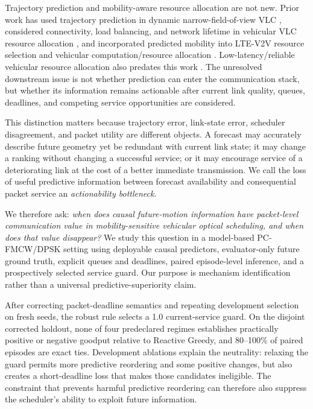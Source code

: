 \documentclass[conference]{IEEEtran}
\begin{document}
Trajectory prediction and mobility-aware resource allocation are not new. Prior work has used trajectory prediction in dynamic narrow-field-of-view VLC \cite{jiang2020trajectory}, considered connectivity, load balancing, and network lifetime in vehicular VLC resource allocation \cite{msongaleli2020resource}, and incorporated predicted mobility into LTE-V2V resource selection and vehicular computation/resource allocation \cite{hajrasouliha2021trajectory,guo2022trajectoryoffload,lu2024predictive}. Low-latency/reliable vehicular resource allocation also predates this work \cite{guo2019latency}. The unresolved downstream issue is not whether prediction can enter the communication stack, but whether its information remains actionable after current link quality, queues, deadlines, and competing service opportunities are considered.

This distinction matters because trajectory error, link-state error, scheduler disagreement, and packet utility are different objects. A forecast may accurately describe future geometry yet be redundant with current link state; it may change a ranking without changing a successful service; or it may encourage service of a deteriorating link at the cost of a better immediate transmission. We call the loss of useful predictive information between forecast availability and consequential packet service an \emph{actionability bottleneck}.

We therefore ask: \emph{when does causal future-motion information have packet-level communication value in mobility-sensitive vehicular optical scheduling, and when does that value disappear?} We study this question in a model-based PC-FMCW/DPSK setting using deployable causal predictors, evaluator-only future ground truth, explicit queues and deadlines, paired episode-level inference, and a prospectively selected service guard. Our purpose is mechanism identification rather than a universal predictive-superiority claim.

After correcting packet-deadline semantics and repeating development selection on fresh seeds, the robust rule selects a 1.0 current-service guard. On the disjoint corrected holdout, none of four predeclared regimes establishes practically positive or negative goodput relative to Reactive Greedy, and 80--100\% of paired episodes are exact ties. Development ablations explain the neutrality: relaxing the guard permits more predictive reordering and some positive changes, but also creates a short-deadline loss that makes those candidates ineligible. The constraint that prevents harmful predictive reordering can therefore also suppress the scheduler's ability to exploit future information.
\end{document}
